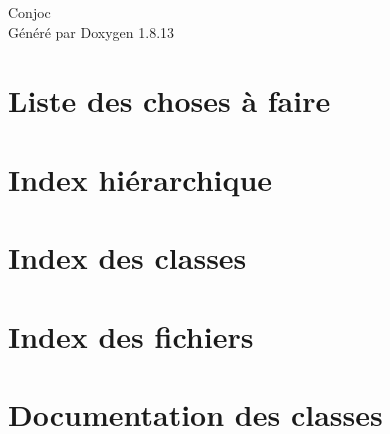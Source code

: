 \documentclass[twoside]{book}
\newcommand{\+}{\discretionary{\mbox{\scriptsize$\hookleftarrow$}}{}{}}
\newcommand{\clearemptydoublepage}{%
  \newpage{\pagestyle{empty}\cleardoublepage}%
}
\begin{document}
\hypersetup{pageanchor=false,
             bookmarksnumbered=true,
             pdfencoding=unicode
            }
\begin{titlepage}
\vspace*{7cm}
\begin{center}%
{\Large Conjoc }\\
\vspace*{1cm}
{\large Généré par Doxygen 1.8.13}\\
\end{center}
\end{titlepage}
\clearemptydoublepage
{}
\tableofcontents
\clearemptydoublepage
{}
\hypersetup{pageanchor=true}

\chapter{Liste des choses à faire}
\label{todo}
\hypertarget{todo}{}

\chapter{Index hiérarchique}

\chapter{Index des classes}

\chapter{Index des fichiers}

\chapter{Documentation des classes}































\end{document}
